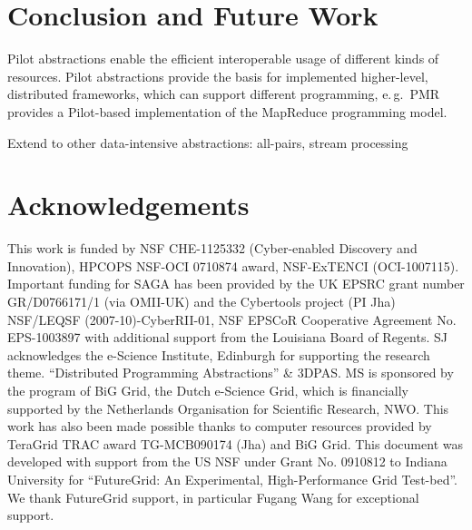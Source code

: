 \documentclass[times]{cpeauth}
\newcommand{\pilot}{Pilot\xspace}
\begin{document}
\section{Conclusion and Future Work}

\pilot abstractions enable the efficient interoperable usage of different 
kinds of resources. \pilot abstractions provide the basis for implemented 
higher-level, distributed frameworks, which can support different programming, 
e.\,g.\ PMR provides a \pilot-based implementation of the MapReduce 
programming model.

Extend to other data-intensive abstractions: all-pairs, stream processing

\section*{Acknowledgements}
This work is funded by NSF CHE-1125332 (Cyber-enabled Discovery and
Innovation), HPCOPS NSF-OCI 0710874 award, NSF-ExTENCI (OCI-1007115).
Important funding for SAGA has been provided by the UK EPSRC grant
number GR/D0766171/1 (via OMII-UK) and the Cybertools project (PI Jha)
NSF/LEQSF (2007-10)-CyberRII-01, NSF EPSCoR Cooperative Agreement
No. EPS-1003897 with additional support from the Louisiana Board of
Regents.  SJ acknowledges the e-Science Institute, Edinburgh for
supporting the research theme. ``Distributed Programming
Abstractions'' \& 3DPAS. MS is sponsored by the program of BiG Grid,
the Dutch e-Science Grid, which is financially supported by the
Netherlands Organisation for Scientific Research, NWO. This work has
also been made possible thanks to computer resources provided by
TeraGrid TRAC award TG-MCB090174 (Jha) and BiG Grid.  This document
was developed with support from the US NSF under Grant No. 0910812 to
Indiana University for ``FutureGrid: An Experimental, High-Performance
Grid Test-bed''. We thank FutureGrid support, in particular Fugang
Wang for exceptional support.



\end{document}
